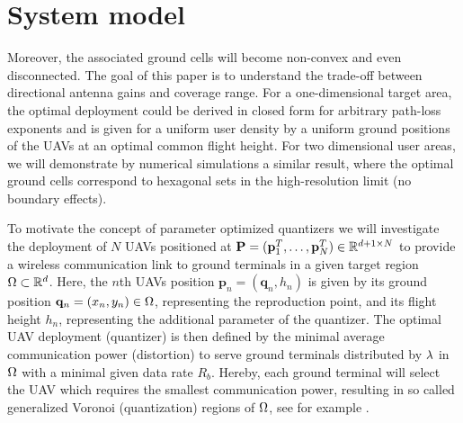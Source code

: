 \documentclass[smallabstract,smallcaptions]{dccpaper}
\newcounter{example}[section]
\renewcommand{\vq}{\mathbf p}
\renewcommand{\vp}{\mathbf q}
\renewcommand{\vQ}{\mathbf P}
\newcommand{\philippstart}{\color{black}}
\newcommand{\philippend}{\color{black}}
\begin{document}
\section{System model}\label{sec:model}
%
\philippstart
{}


Moreover, the associated ground cells will become non-convex and even
disconnected.  The goal of this paper is to understand the trade-off between directional antenna gains and coverage
range. For a one-dimensional target area, the optimal deployment could be derived in closed form for arbitrary path-loss
exponents and is given for a uniform user density by a uniform ground positions of the UAVs at an optimal common flight
height. For two dimensional user areas, we will demonstrate by numerical simulations a similar result, where the optimal
ground cells correspond to hexagonal sets in the high-resolution limit (no boundary effects). 
\philippend
\fi

To motivate the concept of parameter optimized quantizers we will investigate the deployment of $N$ UAVs positioned at
$\vQ=(\vq_1^T,\dots,\vq_N^T)\in\R^{d+1\times N}$ to provide a wireless communication link to ground terminals in a given
target region  $\Omega\subset{\ensuremath{\mathbb R}}^d$. Here, the $n$th UAVs position $\vq_n=(\vp_n,h_n)$ is given by its ground position
$\vp_n=(x_n,y_n)\in\Ome$, representing the reproduction point, and its flight height $h_n$, representing the additional
parameter of the quantizer.  The optimal UAV deployment (quantizer) is then defined by the minimal average communication
power (distortion) to serve ground terminals distributed by $\lambda$ in $\Omega$ with a minimal given data rate $R_b$. Hereby, each
ground terminal will select the UAV which requires the smallest communication power, resulting in  so called
generalized Voronoi (quantization) regions of $\Omega$, see for example \cite{KSS18}.
\end{document}
